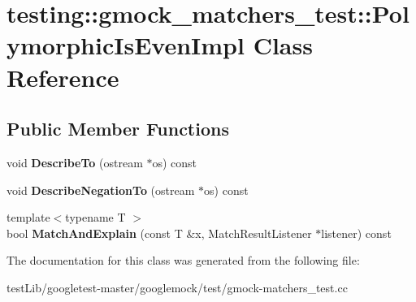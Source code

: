 \hypertarget{classtesting_1_1gmock__matchers__test_1_1PolymorphicIsEvenImpl}{}\section{testing\+:\+:gmock\+\_\+matchers\+\_\+test\+:\+:Polymorphic\+Is\+Even\+Impl Class Reference}
\label{classtesting_1_1gmock__matchers__test_1_1PolymorphicIsEvenImpl}
\subsection*{Public Member Functions}
\begin{DoxyCompactItemize}
\item 
\mbox{\label{classtesting_1_1gmock__matchers__test_1_1PolymorphicIsEvenImpl_ac07eb9f72db98b4b5489a139e844394c}} 
void {\bfseries Describe\+To} (ostream $\ast$os) const
\item 
\mbox{\label{classtesting_1_1gmock__matchers__test_1_1PolymorphicIsEvenImpl_a2e873630451f3cf6cad5bf6f82e00a33}} 
void {\bfseries Describe\+Negation\+To} (ostream $\ast$os) const
\item 
\mbox{\label{classtesting_1_1gmock__matchers__test_1_1PolymorphicIsEvenImpl_ab8d500c4d6c57645527fc367acf6189e}} 
{\footnotesize template$<$typename T $>$ }\\bool {\bfseries Match\+And\+Explain} (const T \&x, Match\+Result\+Listener $\ast$listener) const
\end{DoxyCompactItemize}


The documentation for this class was generated from the following file\+:\begin{DoxyCompactItemize}
\item 
test\+Lib/googletest-\/master/googlemock/test/gmock-\/matchers\+\_\+test.\+cc\end{DoxyCompactItemize}
